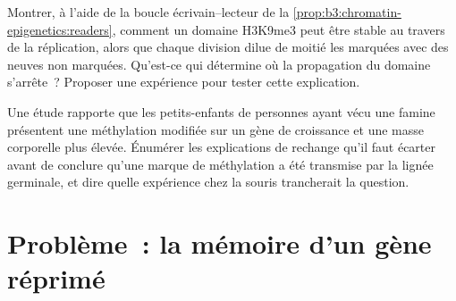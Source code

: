 \begin{exercise}[$\star\star\star$]\label{exo:b3:chromatin-epigenetics:11}
Montrer, à l'aide de la boucle écrivain--lecteur de la
\cref{prop:b3:chromatin-epigenetics:readers}, comment un domaine
H3K9me3 peut être stable au travers de la réplication, alors que chaque
division dilue de moitié les  marquées avec des  neuves
non marquées. Qu'est-ce qui détermine où la propagation du domaine
s'arrête~? Proposer une expérience pour tester cette explication.
\end{exercise}

\begin{exercise}[$\star\star\star$]\label{exo:b3:chromatin-epigenetics:12}
Une étude rapporte que les petits-enfants de personnes ayant vécu une
famine présentent une méthylation modifiée sur un gène de croissance et
une masse corporelle plus élevée. Énumérer les explications de rechange
qu'il faut écarter avant de conclure qu'une marque de méthylation a été
transmise par la lignée germinale, et dire quelle expérience chez la
souris trancherait la question.
\end{exercise}

\section{Problème~: la mémoire d'un gène réprimé}

